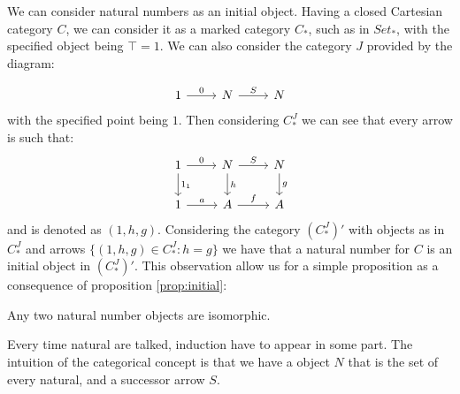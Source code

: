 We can consider natural numbers as an initial object. Having a closed Cartesian category $C$, we can consider it as a marked category $C_*$, such as in $Set_*$, with the specified object being $\top =1$. We can also consider the category $J$ provided by the diagram:

\[
  \begin{tikzcd}
    1\arrow{r}{0} & N\arrow{r}{S} & N
  \end{tikzcd}
\]
with the specified point being $1$. Then considering $C_*^J$ we can see that every arrow is such that: 
\[
  \begin{tikzcd}
    1\arrow{r}{0}\arrow{d}{1_1} & N\arrow{r}{S}\arrow{d}{h} & N\arrow{d}{g}\\
    1\arrow{r}{a} & A\arrow{r}{f} & A
  \end{tikzcd}
\]
and is denoted as $(1,h,g)$. Considering the category $(C_*^J)'$ with objects as in $C_*^J$ and arrows  $\{(1,h,g)\in C_*^J: h=g\}$ we have that a natural number for $C$ is an initial object in $(C_*^J)'$. This observation allow us for a simple proposition as a consequence of proposition \ref{prop:initial}:

\begin{proposition}
  Any two natural number objects are isomorphic.
\end{proposition}

Every time natural are talked, induction have to appear in some part. The intuition of the categorical concept is that we have a object $N$ that is the set of every natural, and a successor arrow $S$. 

